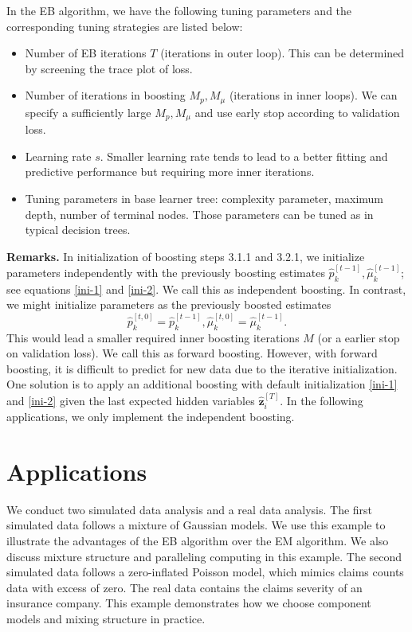 \documentclass[11pt]{article}
\numberwithin{equation}{section}
\def\bz{\boldsymbol{z}}
\begin{document}
In the EB algorithm, we have the following tuning parameters and the corresponding tuning strategies are listed below:
	\begin{itemize}
		\item Number of EB iterations {$T$} (iterations in outer loop). This can be determined by screening the trace plot of loss.
		\item Number of iterations in boosting {$M_p,M_\mu$} (iterations in inner loops). We can specify a sufficiently large $M_p,M_\mu$ and use  early stop according to validation loss.
		\item Learning rate {$s$}. Smaller learning rate tends to lead to a better fitting and predictive performance but requiring more inner iterations.
		\item Tuning parameters in base learner tree: complexity parameter, maximum depth, number of terminal nodes. Those parameters can be tuned as in typical decision trees.
	\end{itemize}

		
{\bf Remarks.}
	In initialization of boosting steps 3.1.1 and 3.2.1, we initialize parameters {independently} with the previously boosting estimates $\hat{p}_k^{[t-1]}, \hat{\mu}_k^{[t-1]}$; see equations \eqref{ini-1} and \eqref{ini-2}. We call this as independent boosting.
	In contrast, we might initialize parameters as the previously boosted estimates $$\hat{p}_k^{[t,0]}=\hat{p}_k^{[t-1]}, \hat{\mu}_k^{[t,0]}=\hat{\mu}_k^{[t-1]}.$$
		This would lead a {smaller} required inner boosting iterations $M$ (or a {earlier} stop on validation loss). 
	We call this as forward boosting. 
	However, with forward boosting, it is difficult to predict for new data due to the {iterative initialization}. One solution is to apply an additional boosting with default initialization \eqref{ini-1} and \eqref{ini-2} given the {last expected hidden variables $\hat{\bz}_i^{[T]}$}. In the following applications, we only implement the independent boosting.
			
\section{Applications}

We conduct two simulated data analysis and a real data analysis. 
The first simulated data follows a mixture of Gaussian models. 
We use this example to illustrate the advantages of the EB algorithm over the EM algorithm.
We also discuss mixture structure and paralleling computing in this example.
The second simulated data follows a zero-inflated Poisson model, which mimics claims counts data with excess of zero.
The real data contains the claims severity of an insurance company. This example demonstrates how we choose component models and mixing structure in practice.
\end{document}
